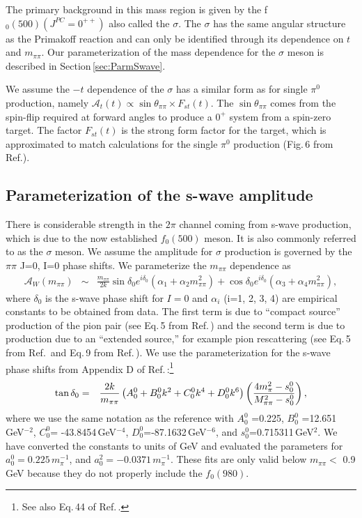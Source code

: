 The primary background in this mass region is given by the 
f$_0(500)(J^{PC}=0^{++})$  also called the $\sigma$. The $\sigma$ has the same angular structure as the Primakoff 
reaction and can only be identified through its dependence on $t$ and $m_{\pi\pi}$.
Our parameterization of the mass dependence for the $\sigma$ meson is described in Section\,\ref{sec:ParmSwave}.

We assume the $-t$ dependence of the $\sigma$ has a similar form as for single $\pi^0$ production, namely $\mathcal{A}_t(t) \propto \sin{\theta_{\pi\pi}} \times F_{st}(t)$.  The $\sin{\theta_{\pi\pi}}$ 
comes from the spin-flip required at forward angles to produce a $0^+$ system from a spin-zero target. The factor $F_{st}(t)$ is the strong form factor for the target, which is approximated to
match calculations for the single $\pi^0$ production (Fig.\,6 from Ref.\cite{Gevorkyan:2009ge}). 



 
\subsection{Parameterization of the s-wave amplitude \label{sec:ParmSwave}}
There is considerable strength in the $2\pi$ channel coming from s-wave production, which is due to the now established $f_0(500)$ meson. It is also commonly referred to as the $\sigma$ 
meson. We assume the amplitude for $\sigma$ production  
is governed by the $\pi\pi$ J=0, I=0 phase shifts. We parameterize the $m_{\pi\pi}$ dependence as 
\begin{eqnarray}       
\mathcal{A}_W(m_{\pi\pi}) & \sim & \frac{m_{\pi\pi}}{2k} \sin{\delta_0} e^{i\delta_0} \left(\alpha_1 + \alpha_2 m_{\pi\pi}^2 \right) + 
 \cos{\delta_0} e^{i\delta_0} \left(\alpha_3 + \alpha_4 m_{\pi\pi}^2 \right),                    \label{eq:Aw}
\end{eqnarray}
where $\delta_0$ is the s-wave phase shift for $I=0$ and $\alpha_i$ (i=1, 2, 3, 4) are empirical constants to be obtained from data.
The first term is due to ``compact source'' production of the pion pair 
(see Eq.\,5 from Ref.\,\cite{Pelaez:2015qba}) and the second term is due to 
production due to an ``extended source,'' for example pion rescattering (see Eq.\,5 from Ref.\,\cite{Bibrzycki:2018pgu} and Eq.\,9 from Ref.\,\cite{Aitchison:1977sm}).  
We use the parameterization for the s-wave phase shifts 
from Appendix D of Ref.\,\cite{Ananthanarayan:2000ht}:\footnote{See also Eq.\,44 of Ref.\,\cite{Pelaez:2015qba}.}  
\begin{eqnarray}  
\tan{\delta_0} & = &  \frac{2k}{m_{\pi\pi}} \left(A_{0}^0 + B_{0}^0 k^2 + C_{0}^0 k^4 + D_{0}^0 k^6 \right) \left(4m_\pi^2 - s_{0}^0 \over M_{\pi\pi}^2 - s_{0}^0 \right), 
\end{eqnarray}
where we use the same notation as the reference with $A_{0}^0$ =0.225, $B_{0}^0$ =12.651\,GeV$^{-2}$, $C_{0}^0$= -43.8454\,GeV$^{-4}$,   $D_{0}^0$=-87.1632\,GeV$^{-6}$, and $s_0^0$=0.715311\,GeV$^2$.
We have converted the constants to units of GeV and evaluated the parameters for $a_0^0=0.225\,m_\pi^{-1}$, and $a_0^2=-0.0371\,m_\pi^{-1}$. These fits are only valid below $m_{\pi\pi}<$ 0.9 GeV because
they do not properly include the $f_0(980)$. 

